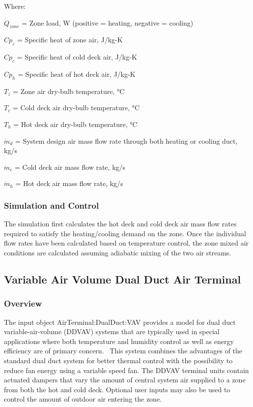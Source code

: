 Where:

\(\dot Q_{zone}\) = Zone load, W (positive = heating, negative = cooling)

\(C{p_z}\) = Specific heat of zone air, J/kg-K

\(C{p_c}\) = Specific heat of cold deck air, J/kg-K

\(C{p_h}\) = Specific heat of hot deck air, J/kg-K

\({T_z}\) = Zone air dry-bulb temperature, °C

\({T_c}\) = Cold deck air dry-bulb temperature, °C

\({T_h}\) = Hot deck air dry-bulb temperature, °C

\({\dot m_d}\) = System design air mass flow rate through both heating or cooling duct, kg/s

\({\dot m_c}\) = Cold deck air mass flow rate, kg/s

\({\dot m_h}\) = Hot deck air mass flow rate, kg/s

\subsubsection{Simulation and Control}\label{simulation-and-control-5}

The simulation first calculates the hot deck and cold deck air mass flow rates required to satisfy the heating/cooling demand on the zone. Once the individual flow rates have been calculated based on temperature control, the zone mixed air conditions are calculated assuming adiabatic mixing of the two air streams.

\subsection{Variable Air Volume Dual Duct Air Terminal}\label{variable-air-volume-dual-duct-air-terminal}

\subsubsection{Overview}\label{overview-4-000}

The input object AirTerminal:DualDuct:VAV provides a model for dual duct variable-air-volume (DDVAV) systems that are typically used in special applications where both temperature and humidity control as well as energy efficiency are of primary concern.~ This system combines the advantages of the standard dual duct system for better thermal control with the possibility to reduce fan energy using a variable speed fan. The DDVAV terminal units contain actuated dampers that vary the amount of central system air supplied to a zone from both the hot and cold deck. Optional user inputs may also be used to control the amount of outdoor air entering the zone.

